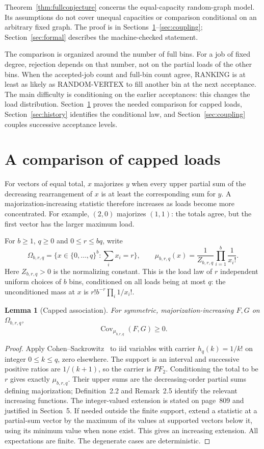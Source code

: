 \documentclass[11pt]{article}
\newtheorem{lemma}[theorem]{Lemma}
\begin{document}
Theorem~\ref{thm:fullconjecture} concerns the equal-capacity random-graph
model. Its assumptions do not cover unequal capacities or comparison
conditional on an arbitrary fixed graph. The proof is in
Sections~\ref{sec:loads}--\ref{sec:coupling};
Section~\ref{sec:formal} describes the machine-checked statement.

The comparison is organized around the number of full bins. For a job of
fixed degree, rejection depends on that number, not on the partial loads
of the other bins. When the accepted-job count and full-bin count agree,
RANKING is at least as likely as RANDOM-VERTEX to fill another bin at the
next acceptance.
The main difficulty is conditioning on the earlier acceptances: this
changes the load distribution. Section~\ref{sec:loads} proves the needed
comparison for capped loads, Section~\ref{sec:history} identifies the
conditional law, and Section~\ref{sec:coupling} couples successive
acceptance levels.

\section{A comparison of capped loads}\label{sec:loads}
For vectors of equal total, $x$ majorizes $y$ when every upper partial
sum of the decreasing rearrangement of $x$ is at least the corresponding
sum for $y$. A majorization-increasing statistic therefore increases as
loads become more concentrated. For example, $(2,0)$ majorizes $(1,1)$:
the totals agree, but the first vector has the larger maximum load.

For $b\geq1$, $q\geq0$ and $0\leq r\leq bq$, write
\[
 \Omega_{b,r,q}=\{x\in\{0,\ldots,q\}^b:\textstyle\sum_i x_i=r\},
 \qquad \mu_{b,r,q}(x)=\frac1{Z_{b,r,q}}\prod_{i=1}^b\frac1{x_i!}.
\]
Here $Z_{b,r,q}>0$ is the normalizing constant. This is the load law of
$r$ independent uniform choices of $b$ bins, conditioned on all loads
being at most $q$: the unconditioned mass at $x$ is
$r!b^{-r}\prod_i1/x_i!$.

\begin{lemma}[Capped association]\label{lem:csassociation}
For symmetric, majorization-increasing $F,G$ on $\Omega_{b,r,q}$,
\[
 \operatorname{Cov}_{\mu_{b,r,q}}(F,G)\geq0.
\]
\end{lemma}
\begin{proof}
Apply Cohen--Sackrowitz~\cite[Lemma 4.1]{cs} to iid variables with
carrier $h_q(k)=1/k!$ on integer $0\leq k\leq q$, zero elsewhere.
The support is an interval and successive positive ratios are
$1/(k+1)$, so the carrier is $PF_2$. Conditioning the total to be $r$
gives exactly $\mu_{b,r,q}$. Their upper sums are the decreasing-order
partial sums defining majorization; Definition~2.2 and Remark~2.5 identify
the relevant increasing functions. The integer-valued extension is stated
on page~809 and justified in Section~5. If needed outside the finite
support, extend a statistic at a partial-sum vector by the maximum of its
values at supported vectors below it, using its minimum value when none
exist. This gives an increasing extension. All expectations are finite.
The degenerate cases are deterministic.
\end{proof}
\end{document}
